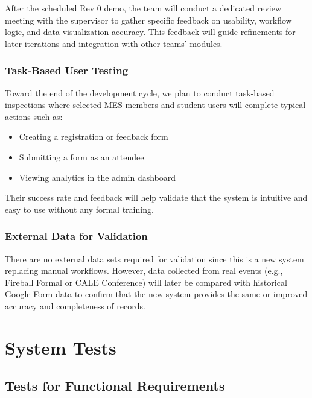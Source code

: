 \documentclass[12pt, titlepage]{article}
\begin{document}
After the scheduled Rev 0 demo, the team will conduct a dedicated review meeting with the supervisor to gather specific feedback on usability, workflow logic, and data visualization accuracy. This feedback will guide refinements for later iterations and integration with other teams’ modules.

\subsubsection*{Task-Based User Testing}
Toward the end of the development cycle, we plan to conduct task-based inspections where selected MES members and student users will complete typical actions such as:
\begin{itemize}
  \item Creating a registration or feedback form
  \item Submitting a form as an attendee
  \item Viewing analytics in the admin dashboard
\end{itemize}
Their success rate and feedback will help validate that the system is intuitive and easy to use without any formal training.

\subsubsection*{External Data for Validation}
There are no external data sets required for validation since this is a new system replacing manual workflows. However, data collected from real events (e.g., Fireball Formal or CALE Conference) will later be compared with historical Google Form data to confirm that the new system provides the same or improved accuracy and completeness of records.

\section{System Tests}


\subsection{Tests for Functional Requirements}

\end{document}
